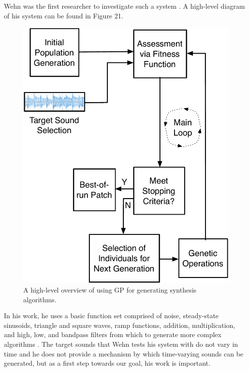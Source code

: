\documentclass[12pt]{report} 	%
\numberwithin{figure}{chapter}
\numberwithin{table}{chapter}
\numberwithin{equation}{chapter}
\begin{document}
\begin{flushleft}
Wehn was the first researcher to investigate such a system \cite{Wehn:1998bh}. A high-level diagram of his system can be found in Figure 21.
\begin{figure}[h!]
\vspace{24pt}
\begin{center}
\includegraphics[scale = 0.6]{SimpleSystem}
\caption[GP for sound synthesis]{A high-level overview of using GP for generating synthesis algorithms.}
\end{center}
\vspace{6pt}
\end{figure}
In his work, he uses a basic \clearpage
\noindent function set comprised of noise, steady-state sinusoids, triangle and square waves, ramp functions, addition, multiplication, and high, low, and bandpass filters from which to generate more complex algorithms \cite[p. 2]{Wehn:1998bh}. The target sounds that Wehn tests his system with do not vary in time and he does not provide a mechanism by which time-varying sounds can be generated, but as a first step towards our goal, his work is important.


\end{flushleft}
\end{document}
